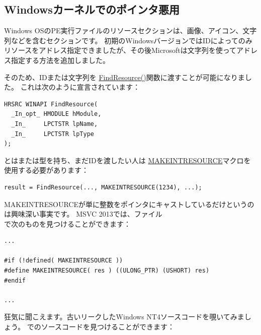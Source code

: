 \subsection{Windowsカーネルでのポインタ悪用}

Windows OSのPE実行ファイルのリソースセクションは、画像、アイコン、文字列などを含むセクションです。
初期のWindowsバージョンではIDによってのみリソースをアドレス指定できましたが、その後Microsoftは文字列を使ってアドレス指定する方法を追加しました。

そのため、IDまたは文字列を
\href{https://msdn.microsoft.com/en-us/library/windows/desktop/ms648042%28v=vs.85%29.aspx}{FindResource()}関数に渡すことが可能になりました。
これは次のように宣言されています：


\begin{lstlisting}[style=customc]
HRSRC WINAPI FindResource(
  _In_opt_ HMODULE hModule,
  _In_     LPCTSTR lpName,
  _In_     LPCTSTR lpType
);
\end{lstlisting}

とはまたは型を持ち、まだIDを渡したい人は
\href{https://msdn.microsoft.com/en-us/library/windows/desktop/ms648029%28v=vs.85%29.aspx}{MAKEINTRESOURCE}マクロを使用する必要があります：


\begin{lstlisting}[style=customc]
result = FindResource(..., MAKEINTRESOURCE(1234), ...);
\end{lstlisting}

MAKEINTRESOURCEが単に整数をポインタにキャストしているだけというのは興味深い事実です。
MSVC 2013では、ファイル\\
で次のものを見つけることができます：

\begin{lstlisting}[style=customc]
...

#if (!defined( MAKEINTRESOURCE )) 
#define MAKEINTRESOURCE( res ) ((ULONG_PTR) (USHORT) res)
#endif

...
\end{lstlisting}

狂気に聞こえます。古いリークしたWindows NT4ソースコードを覗いてみましょう。
でのソースコードを見つけることができます：

